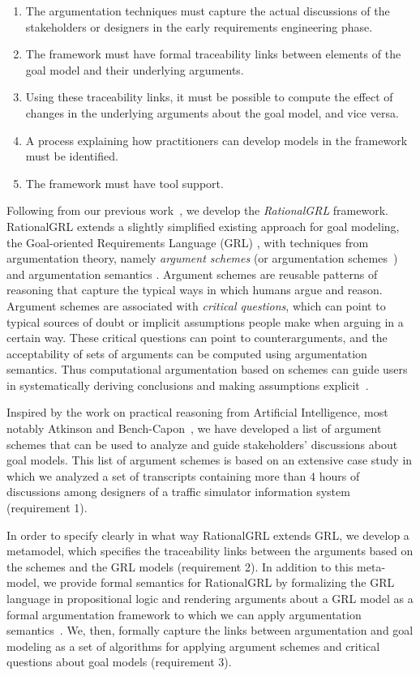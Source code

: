 \begin{enumerate}
\item 
The argumentation techniques must capture the actual discussions of the stakeholders or designers in the early requirements engineering phase.
\item 
The framework must have formal traceability links between elements of the goal model and their underlying arguments.
\item 
Using these traceability links, it must be possible to compute the effect of changes in the underlying arguments about the goal model, and vice versa.
\item 
A process explaining how practitioners can develop models in the framework must be identified.
\item 
The framework must have tool support.
\end{enumerate}

Following from our previous work~\cite{vanzee-etal:renext2015,vanZee-etal:er2016}, we develop the \emph{RationalGRL} framework. RationalGRL extends a slightly simplified existing approach for goal modeling, the Goal-oriented Requirements Language (GRL) \cite{Amyot:2010:EGM:1841349.1841356}, with techniques from argumentation theory, namely \emph{argument schemes} (or argumentation schemes~\cite{walton-etal2008}) and argumentation semantics \cite{Dung1995}. Argument schemes are reusable patterns of reasoning that capture the typical ways in which humans argue and reason. Argument schemes are associated with \emph{critical questions}, which can point to typical sources of doubt or implicit assumptions people make when arguing in a certain way. These critical questions can point to counterarguments, and the acceptability of sets of arguments can be computed using argumentation semantics. Thus computational argumentation based on schemes can guide users in systematically deriving conclusions and making assumptions explicit~\cite{bexEtal2003,murukannaiah2015}. 

Inspired by the work on practical reasoning from Artificial Intelligence, most notably Atkinson and Bench-Capon~\cite{atkinson2007}, we have developed a list of argument schemes that can be used to analyze and guide stakeholders' discussions about goal models. This list of argument schemes is based on an extensive case study in which we analyzed a set of transcripts containing more than 4 hours of discussions among designers of a traffic simulator information system (requirement 1). 

In order to specify clearly in what way RationalGRL extends GRL, we develop a metamodel, which specifies the traceability links between the arguments based on the schemes and the GRL models (requirement 2). In addition to this meta-model, we provide formal semantics for RationalGRL by formalizing the GRL language in propositional logic and rendering arguments about a GRL model as a formal argumentation framework to which we can apply argumentation semantics~\cite{Dung1995}. We, then, formally capture the links between argumentation and goal modeling as a set of algorithms for applying argument schemes and critical questions about goal models (requirement 3). 

